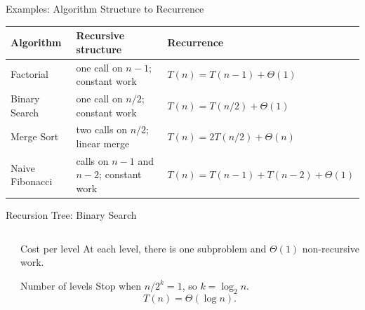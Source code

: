 \documentclass[aspectratio=169]{beamer}
\begin{document}
\begin{frame}{Examples: Algorithm Structure to Recurrence}
  \small
  \begin{center}
    \renewcommand{\arraystretch}{1.18}
    \begin{tabular}{L{0.28\textwidth}L{0.30\textwidth}L{0.25\textwidth}}
      \toprule
      \textbf{Algorithm} & \textbf{Recursive structure} & \textbf{Recurrence} \\
      \midrule
      Factorial & one call on $n-1$; constant work & $T(n)=T(n-1)+\Theta(1)$ \\
      \addlinespace
      Binary Search & one call on $n/2$; constant work & $T(n)=T(n/2)+\Theta(1)$ \\
      \addlinespace
      Merge Sort & two calls on $n/2$; linear merge & $T(n)=2T(n/2)+\Theta(n)$ \\
      \addlinespace
      Naive Fibonacci & calls on $n-1$ and $n-2$; constant work & $T(n)=T(n-1)+T(n-2)+\Theta(1)$ \\
      \bottomrule
    \end{tabular}
  \end{center}
\end{frame}

\begin{frame}{Recursion Tree: Binary Search}
  \begin{columns}[T]
    \begin{column}{0.54\textwidth}
      \begin{center}
      \end{center}
    \end{column}
    \begin{column}{0.42\textwidth}
      \begin{block}{Cost per level}
        \small
        At each level, there is one subproblem and $\Theta(1)$ non-recursive work.
      \end{block}
      \begin{exampleblock}{Number of levels}
        \small
        Stop when $n/2^k=1$, so $k=\log_2 n$.
        \[
          T(n)=\Theta(\log n).
        \]
      \end{exampleblock}
    \end{column}
  \end{columns}
\end{frame}
\end{document}
